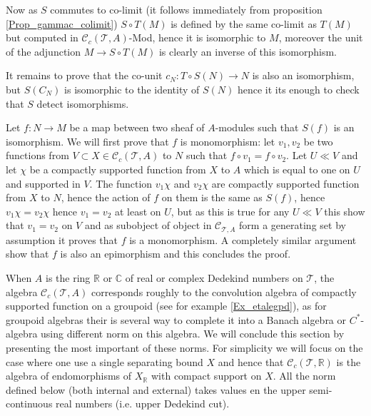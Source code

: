 \documentclass[a4paper]{article}
\newcommand{\R}{\mathbb{R}}
\newcommand{\Tcal}{\mathcal{T}}
\newcommand{\Ccal}{\mathcal{C}}
\newcommand{\blockn}[1]{\par #1 \bigskip}
\begin{document}
{{Now as $S$ commutes to co-limit (it follows immediately from proposition \ref{Prop_gammac_colimit}) $S \circ T(M)$ is defined by the same co-limit as $T(M)$ but computed in $\Ccal_c(\Tcal,A)$-Mod, hence it is isomorphic to $M$, moreover the unit of the adjunction $M \rightarrow S \circ T(M)$ is clearly an inverse of this isomorphism.

It remains to prove that the co-unit $c_N : T \circ S (N) \rightarrow N$ is also an isomorphism, but $S(C_N)$ is isomorphic to the identity of $S(N)$ hence it its enough to check that $S$ detect isomorphisms.

Let $f : N \rightarrow M$ be a map between two sheaf of $A$-modules such that $S(f)$ is an isomorphism. 
We will first prove that $f$ is monomorphism: let $v_1,v_2$ be two functions from  $V \subset X \in \Ccal_c(\Tcal,A)$ to $N$ such that $f \circ v_1 =f \circ v_2$. Let $U \ll V$ and let $\chi$ be a compactly supported function from $X$ to $A$ which is equal to one on $U$ and supported in $V$. The function $v_1 \chi$ and $v_2 \chi$ are compactly supported function from $X$ to $N$, hence the action of $f$ on them is the same as $S(f)$, hence $v_1 \chi = v_2 \chi$ hence $v_1 = v_2$ at least on $U$, but as this is true for any $U \ll V$ this show that $v_1= v_2$ on $V$ and as subobject of object in $\Ccal_{\Tcal,A}$ form a generating set by assumption it proves that $f$ is a monomorphism. A completely similar argument show that $f$ is also an epimorphism and this concludes the proof.
}
}



\blockn{When $A$ is the ring $\R$ or $\mathbb{C}$ of real or complex Dedekind numbers on $\Tcal$, the algebra $\Ccal_c(\Tcal,A)$ corresponds roughly to the convolution algebra of compactly supported function on a groupoid (see for example \ref{Ex_etalegpd}), as for groupoid algebras their is several way to complete it into a Banach algebra or $C^*$-algebra using different norm on this algebra. We will conclude this section by presenting the most important of these norms. For simplicity we will focus on the case where one use a single separating bound $X$ and hence that $\Ccal_c(\Tcal,\mathbb{R})$ is the algebra of endomorphisms of $X_{\mathbb{R}}$ with compact support on $X$. All the norm defined below (both internal and external) takes values en the upper semi-continuous real numbers (i.e. upper Dedekind cut).}
\end{document}
